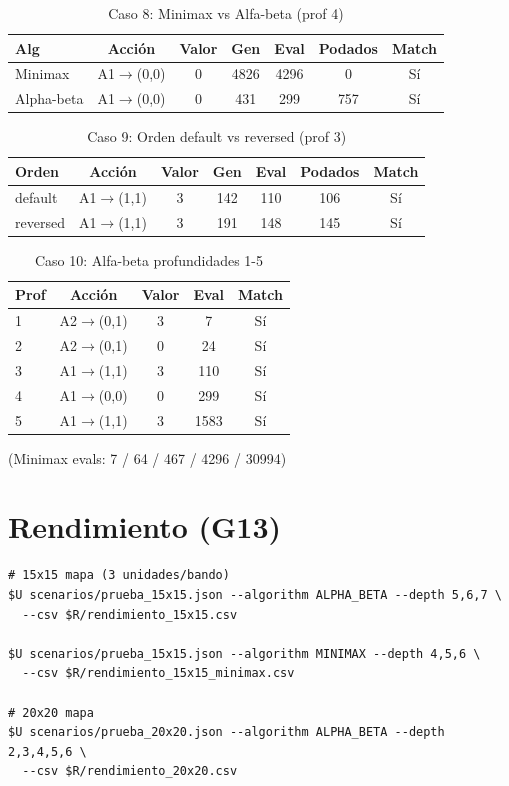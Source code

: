 \begin{table}[H]
\centering
\caption{Caso 8: Minimax vs Alfa-beta (prof 4)}
\begin{tabular}{lcccccc}
\toprule
Alg & Acción & Valor & Gen & Eval & Podados & Match \\
\midrule
Minimax & A1$\to$(0,0) & 0 & 4826 & 4296 & 0 & Sí \\
Alpha-beta & A1$\to$(0,0) & 0 & 431 & 299 & 757 & Sí \\
\bottomrule
\end{tabular}
\end{table}

\begin{table}[H]
\centering
\caption{Caso 9: Orden default vs reversed (prof 3)}
\begin{tabular}{lcccccc}
\toprule
Orden & Acción & Valor & Gen & Eval & Podados & Match \\
\midrule
default & A1$\to$(1,1) & 3 & 142 & 110 & 106 & Sí \\
reversed & A1$\to$(1,1) & 3 & 191 & 148 & 145 & Sí \\
\bottomrule
\end{tabular}
\end{table}

\begin{table}[H]
\centering
\caption{Caso 10: Alfa-beta profundidades 1-5}
\begin{tabular}{lcccc}
\toprule
Prof & Acción & Valor & Eval & Match \\
\midrule
1 & A2$\to$(0,1) & 3 & 7 & Sí \\
2 & A2$\to$(0,1) & 0 & 24 & Sí \\
3 & A1$\to$(1,1) & 3 & 110 & Sí \\
4 & A1$\to$(0,0) & 0 & 299 & Sí \\
5 & A1$\to$(1,1) & 3 & 1583 & Sí \\
\bottomrule
\end{tabular}
\end{table}
(Minimax evals: 7 / 64 / 467 / 4296 / 30994)

\section{Rendimiento (G13)}
\label{sec:rep-rendimiento}

\begin{verbatim}
# 15x15 mapa (3 unidades/bando)
$U scenarios/prueba_15x15.json --algorithm ALPHA_BETA --depth 5,6,7 \
  --csv $R/rendimiento_15x15.csv

$U scenarios/prueba_15x15.json --algorithm MINIMAX --depth 4,5,6 \
  --csv $R/rendimiento_15x15_minimax.csv

# 20x20 mapa
$U scenarios/prueba_20x20.json --algorithm ALPHA_BETA --depth 2,3,4,5,6 \
  --csv $R/rendimiento_20x20.csv
\end{verbatim}

